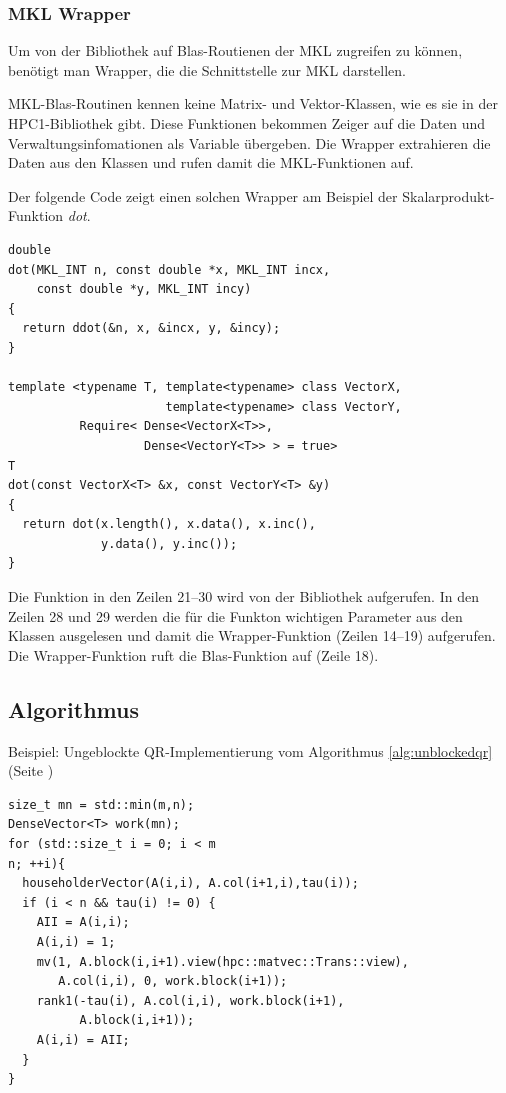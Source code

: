 \subsubsection{MKL Wrapper}
Um von der Bibliothek auf Blas-Routienen der MKL zugreifen zu können, benötigt man Wrapper, die die Schnittstelle zur MKL darstellen.

MKL-Blas-Routinen kennen keine Matrix- und Vektor-Klassen, wie es sie in der HPC1-Bibliothek gibt. Diese Funktionen bekommen Zeiger auf die Daten und Verwaltungsinfomationen als Variable übergeben.
Die Wrapper extrahieren die Daten aus den Klassen und rufen damit die MKL-Funktionen auf.

Der folgende Code zeigt einen solchen Wrapper am Beispiel der Skalarprodukt-Funktion \textit{dot}.
\lstset{numbers=left,firstnumber=14}
\begin{lstlisting}
double
dot(MKL_INT n, const double *x, MKL_INT incx,
    const double *y, MKL_INT incy)
{
  return ddot(&n, x, &incx, y, &incy);
}

template <typename T, template<typename> class VectorX,
                      template<typename> class VectorY,
          Require< Dense<VectorX<T>>,
                   Dense<VectorY<T>> > = true>
T
dot(const VectorX<T> &x, const VectorY<T> &y)
{
  return dot(x.length(), x.data(), x.inc(), 
             y.data(), y.inc());
}
\end{lstlisting}
Die Funktion in den Zeilen 21--30 wird von der Bibliothek aufgerufen.
In den Zeilen 28 und 29 werden die für die Funkton wichtigen Parameter aus den Klassen ausgelesen und damit die Wrapper-Funktion (Zeilen 14--19) aufgerufen. Die Wrapper-Funktion ruft die Blas-Funktion auf (Zeile 18).


\subsection{Algorithmus}

Beispiel: Ungeblockte QR-Implementierung vom Algorithmus \ref{alg:unblockedqr} (Seite \pageref{alg:unblockedqr})
\lstset{numbers=left,firstnumber=1}
\begin{lstlisting}
size_t mn = std::min(m,n);
DenseVector<T> work(mn);
for (std::size_t i = 0; i < m
n; ++i){
  householderVector(A(i,i), A.col(i+1,i),tau(i));
  if (i < n && tau(i) != 0) {
    AII = A(i,i);
    A(i,i) = 1;
    mv(1, A.block(i,i+1).view(hpc::matvec::Trans::view),
       A.col(i,i), 0, work.block(i+1));
    rank1(-tau(i), A.col(i,i), work.block(i+1), 
          A.block(i,i+1));
    A(i,i) = AII;
  }
}
\end{lstlisting}

